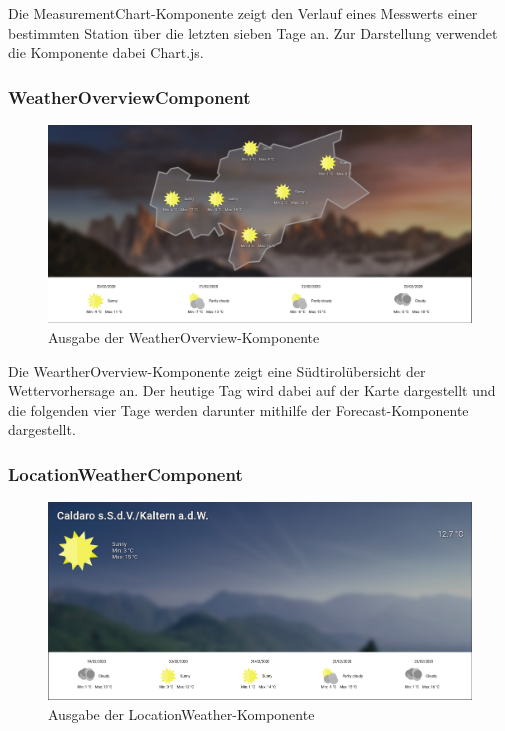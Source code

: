 \documentclass[a4paper,12pt]{article}
\begin{document}
Die MeasurementChart-Komponente zeigt den Verlauf eines Messwerts einer bestimmten
Station über die letzten sieben Tage an. Zur Darstellung verwendet die Komponente
dabei Chart.js.

\subsubsection{WeatherOverviewComponent}
\begin{figure}[H]
    \centering
    \includegraphics[width=0.9\linewidth]{assets/weather-overview.png}
    \caption{Ausgabe der WeatherOverview-Komponente}
    \label{fig:weather-overview}
\end{figure}

Die WeartherOverview-Komponente zeigt eine Südtirolübersicht der Wettervorhersage
an. Der heutige Tag wird dabei auf der Karte dargestellt und die folgenden vier
Tage werden darunter mithilfe der Forecast-Komponente dargestellt.

\subsubsection{LocationWeatherComponent}
\begin{figure}[H]
    \centering
    \includegraphics[width=0.9\linewidth]{assets/local-weather.png}
    \caption{Ausgabe der LocationWeather-Komponente}
    \label{fig:location-weater}
\end{figure}
\end{document}
